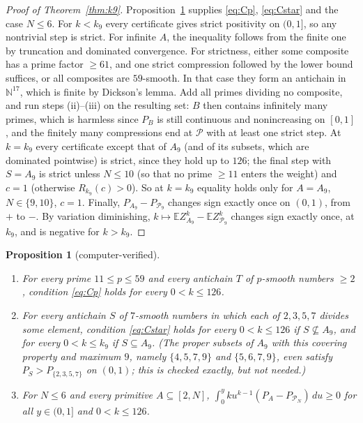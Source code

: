 \documentclass[11pt]{article}
\newtheorem{proposition}[theorem]{Proposition}
\theoremstyle{remark}
\newcommand{\Prm}{\mathcal{P}}
\newcommand{\E}{\mathbb{E}}
\begin{document}
\begin{proof}[Proof of Theorem~\ref{thm:k9}]
Proposition~\ref{prop:cert} supplies \eqref{eq:Cp}, \eqref{eq:Cstar} and the case $N\le6$. For
$k<k_9$ every certificate gives strict positivity on $(0,1]$, so any nontrivial step is strict.
For infinite $A$, the inequality follows from the finite one by truncation and dominated
convergence. For strictness, either some composite has a prime factor $\ge61$, and one strict
compression followed by the lower bound suffices, or all composites are $59$-smooth. In that case
they form an antichain in $\mathbb N^{17}$, which is finite by Dickson's lemma. Add all primes
dividing no composite, and run steps (ii)--(iii) on the resulting set: $B$ then contains
infinitely many primes, which is harmless since $P_B$ is still continuous and nonincreasing on
$[0,1]$, and the finitely many compressions end at $\Prm$ with at least one strict step. At $k=k_9$ every certificate except that of $A_9$ (and of its subsets, which are dominated
pointwise) is strict, since they hold up to $126$; the final step with $S=A_9$ is strict unless
$N\le10$ (so that no prime $\ge11$ enters the weight) and $c=1$ (otherwise $R_{k_9}(c)>0$). So at
$k=k_9$ equality holds only for $A=A_9$, $N\in\{9,10\}$, $c=1$. Finally,
$P_{A_9}-P_{\Prm_9}$ changes sign exactly once on $(0,1)$, from $+$ to $-$. By variation
diminishing, $k\mapsto\E Z_{A_9}^k-\E Z_{\Prm_9}^k$ changes sign exactly once, at $k_9$, and is
negative for $k>k_9$.
\end{proof}

\begin{proposition}[computer-verified]\label{prop:cert}
\begin{enumerate}
\item[(a)] For every prime $11\le p\le59$ and every antichain $T$ of $p$-smooth numbers $\ge2$,
condition \eqref{eq:Cp} holds for every $0<k\le126$.
\item[(b)] For every antichain $S$ of $7$-smooth numbers in which each of $2,3,5,7$ divides some
element, condition \eqref{eq:Cstar} holds for every $0<k\le126$ if $S\not\subseteq A_9$, and for
every $0<k\le k_9$ if $S\subseteq A_9$. (The proper subsets of $A_9$ with this covering property and
maximum $9$, namely $\{4,5,7,9\}$ and $\{5,6,7,9\}$, even satisfy $P_S>P_{\{2,3,5,7\}}$ on $(0,1)$;
this is checked exactly, but not needed.)
\item[(c)] For $N\le6$ and every primitive $A\subseteq[2,N]$,
$\int_0^yku^{k-1}(P_A-P_{\Prm_N})\,du\ge0$ for all $y\in(0,1]$ and $0<k\le126$.
\end{enumerate}
\end{proposition}
\end{document}

